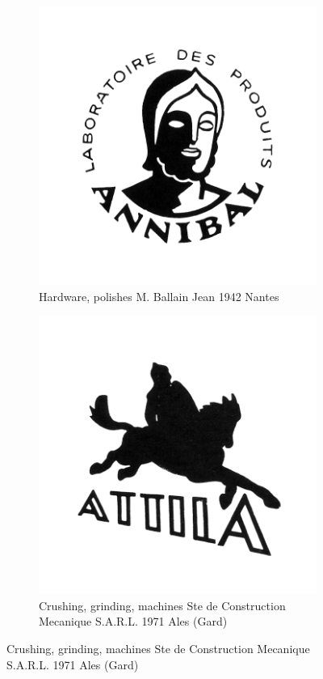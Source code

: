 \begin{figure}[h]
  \begin{subfigure}{.45\textwidth}
    \centering
    \includegraphics[width=.5\linewidth]{images/supplement/trademarks/french/6_3}
    \caption{Hardware, polishes M. Ballain Jean 1942 Nantes}
    \label{fig:trademarks:french:6.3}
  \end{subfigure}
  \begin{subfigure}{.45\textwidth}
    \centering
    \includegraphics[width=.5\linewidth]{images/supplement/trademarks/french/6_4}
    \caption{Crushing, grinding, machines Ste de Construction Mecanique S.A.R.L. 1971 Ales (Gard)}
    \label{fig:trademarks:french:6.4}
  \end{subfigure}


\end{figure}
